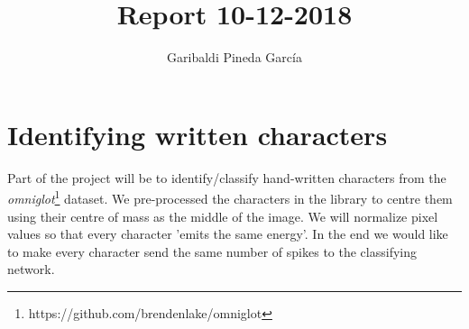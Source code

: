 \documentclass[11pt,a4paper]{article}
\author{Garibaldi Pineda Garc{\'i}a}
\title{Report 10-12-2018}
\begin{document}
\maketitle

\section{Identifying written characters}

Part of the project will be to identify/classify hand-written characters from the \emph{omniglot}\footnote{https://github.com/brendenlake/omniglot} dataset\cite{omniglot}. 
We pre-processed the characters in the library to centre them using their centre of mass as the middle of the image.
We will normalize pixel values so that every character 'emits the same energy'. 
In the end we would like to make every character send the same number of spikes to the classifying network.




\end{document}
